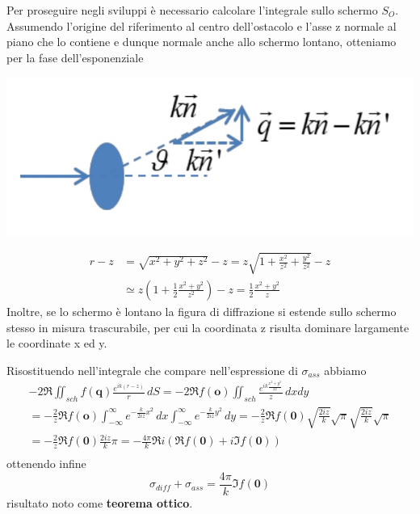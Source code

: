 Per proseguire negli sviluppi è necessario calcolare l'integrale sullo schermo $S_O$.
Assumendo l'origine del riferimento al centro dell'ostacolo e l'asse z normale al piano che lo contiene e dunque normale anche allo schermo lontano, otteniamo per la fase dell'esponenziale

\begin{marginfigure}
	\centering
	\includegraphics[width = 1.25 \textwidth, height = 1.25 \textheight]{figs/schema-vett-trasferito}
	\label{fig:vett-trasferito}
\end{marginfigure}

\begin{align*}
	r - z & = \sqrt{x^2 + y^2+z^2} -z = z\sqrt{1 + \frac{x^2}{z^2}+\frac{y^2}{z^2}} -z                       \\
	      & \simeq z \left( 1 + \frac{1}{2}\frac{x^2 + y^2}{z^2}\right) -z  = \frac{1}{2}\frac{x^2 + y^2}{z}
\end{align*} Inoltre, se lo schermo è lontano la figura di diffrazione si estende sullo schermo stesso in misura trascurabile, per cui la coordinata z risulta dominare largamente le coordinate x ed y.

Risostituendo nell'integrale che compare nell'espressione di $\sigma_{ass}$ abbiamo \begin{gather*}
	- 2 \Re\iint_{sch}f(\bm{q})\frac{e^{ik(r-z)}}{r} \, dS =
	- 2 \Re f(\bm{o}) \iint_{sch}\frac{e^{ik \frac{x^2 + y^2}{2z}}}{z} \, dxdy\\
	= - \frac{2}{z} \Re f(\bm{o}) \int_{- \infty}^{\infty} e ^{- \frac{k}{2iz}x^2} \, dx
	\int_{- \infty}^{\infty} e ^{- \frac{k}{2iz}y^2} \, dy = - \frac{2}{z} \Re f(\bm{0}) \sqrt{\frac{2iz}{k}}\sqrt{\pi}\sqrt{\frac{2iz}{k}}\sqrt{\pi}\\
	= - \frac{2}{z} \Re f(\bm{0}) \frac{2iz}{k}\pi = - \frac{4 \pi}{k} \Re i (\Re f(\bm{0}) + i  \Im f(\bm{0}))\\
\end{gather*} ottenendo infine \[
	\boxed{\sigma_{diff} + \sigma_{ass} = \frac{4 \pi}{k} \Im f(\bm{0})}
\] risultato noto come \textbf{teorema ottico}.

